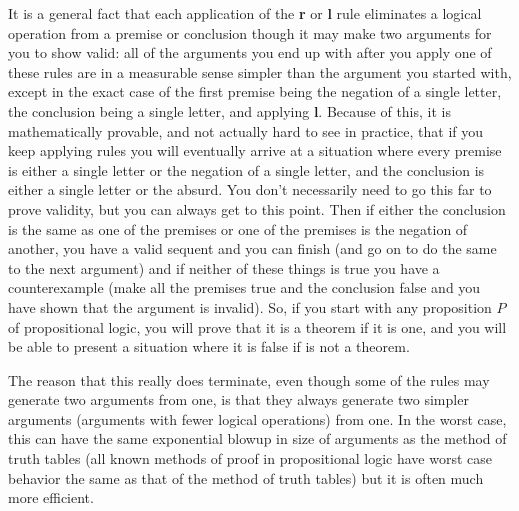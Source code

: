 \documentclass[12pt]{article}
\begin{document}
It is a general fact that each application of the {\bf r} or {\bf l} rule eliminates a logical operation from a premise or conclusion though it may make two arguments for you to show valid:  all of the arguments you end up with
after you apply one of these rules are in a measurable sense simpler than the argument you started with, except in the exact case of the first premise being the negation of a single letter, the conclusion being a single letter,
and applying {\bf l}.  Because of this, it is mathematically provable, and not actually hard to see in practice, that if you keep applying rules you will eventually arrive at a situation where every premise is either a single letter
or the negation of a single letter, and the conclusion is either a single letter or the absurd.  You don't necessarily need to go this far to prove validity, but you can always get to this point.  Then if either the conclusion is the same as one of the premises or one of the premises is the negation of another, you have a valid sequent and you can finish (and go on to do the same to the next argument) and if neither of these things is true you have a counterexample (make all the premises
true and the conclusion false and you have shown that the argument is invalid).  So, if you start with any proposition $P$ of propositional logic, you will prove that it is a theorem if it is one, and you will be able to present a situation where it is false if is not a theorem.

The reason that this really does terminate, even though some of the rules may generate two arguments from one, is that they always generate two simpler arguments (arguments with fewer logical operations) from one.  In the worst case,
this can have the same exponential blowup in size of arguments as the method of truth tables (all known methods of proof in propositional logic have worst case behavior the same as that of the method of truth tables) but it is often much more efficient.
\end{document}
